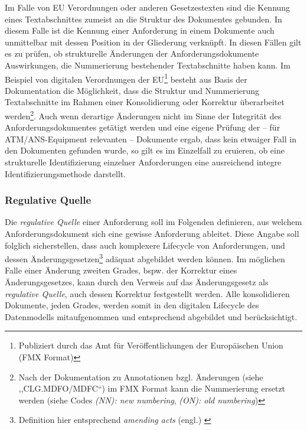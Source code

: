 Im Falle von EU Verordnungen oder anderen Gesetzestexten sind die Kennung eines Textabschnittes zumeist an die Struktur des Dokumentes gebunden. 
In diesem Falle ist die Kennung einer Anforderung in einem Dokumente auch unmittelbar mit dessen Position in der Gliederung verknüpft. 
In diesen Fällen gilt es zu prüfen, ob strukturelle Änderungen der Anforderungsdokumente Auswirkungen, die Nummerierung bestehender Textabschnitte haben kann.
Im Beispiel von digitalen Verordnungen der EU\footnote{Publiziert durch das Amt für Veröffentlichungen der Europäischen Union (FMX Format)} besteht aus Basis der Dokumentation die Möglichkeit, dass die Struktur und Nummerierung Textabschnitte im Rahmen einer Konsolidierung oder Korrektur überarbeitet werden\footnote{Nach der Dokumentation zu Annotationen bzgl. Änderungen (siehe ,,CLG.MDFO/MDFC``) im FMX Format kann die Nummerierung ersetzt werden (siehe Codes \textit{(NN): new numbering}, \textit{(ON): old numbering})\cite[vgl S. 76-79]{eu_fmx4_proc}}. 
Auch wenn derartige Änderungen nicht im Sinne der Integrität des Anforderungsdokumentes getätigt werden und eine eigene Prüfung der -- für ATM/ANS-Equipment relevanten -- Dokumente ergab, dass kein etwaiger Fall in den Dokumenten gefunden wurde, so gilt es im Einzelfall zu eruieren, ob eine strukturelle Identifizierung einzelner Anforderungen eine ausreichend integre Identifizierungsmethode darstellt. 


\subsubsection{Regulative Quelle}

Die \textit{regulative Quelle} einer Anforderung soll im Folgenden definieren, aus welchem Anforderungsdokument sich eine gewisse Anforderung ableitet. 
Diese Angabe soll folglich sicherstellen, dass auch komplexere Lifecycle von Anforderungen, und dessen Änderungsgesetzen\footnote{Definition hier entsprechend  \textit{amending acts} (engl.) \cite{eu_consolidation}} adäquat abgebildet werden können.
Im möglichen Falle einer Änderung zweiten Grades, bspw. der Korrektur eines Änderungsgesetzes, kann durch den Verweis auf das Änderungsgesetz als \textit{regulative Quelle}, auch dessen Korrektur festgestellt werden. 
Alle konsolidieren Dokumente, jeden Grades, werden somit in den digitalen Lifecycle des Datenmodells mitaufgenommen und entsprechend abgebildet und berücksichtigt.  


